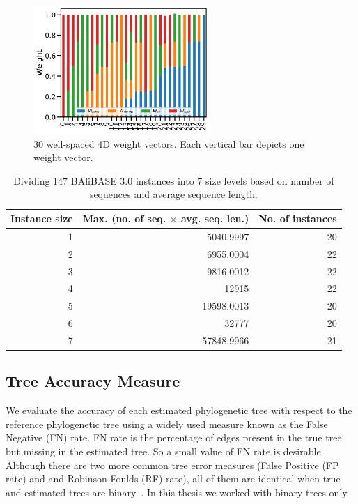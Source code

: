 \begin{figure}[!htbp]%
	\centering
	\includegraphics[width=0.6\textwidth]{Figure/30-4D-weight}
	\caption{30 well-spaced 4D weight vectors. Each vertical bar depicts one weight vector.}
	\label{fig:30-weights}
\end{figure}

\begin{table}[htbp]
	\centering
	\caption{Dividing 147 BAliBASE 3.0 instances into 7 size levels based on number of sequences and average sequence length.}
	\begin{tabular}{r|r|r}
		\multicolumn{1}{l|}{Instance size} & \multicolumn{1}{l|}{Max. (no. of seq. $\times$ avg. seq. len.)} & No. of instances\\
		\hline
		1     & 5040.9997 & 20 \\
		\hline
		2     & 6955.0004 & 22 \\
		\hline
		3     & 9816.0012 & 22 \\
		\hline
		4     & 12915 & 22 \\
		\hline
		5     & 19598.0013 & 20 \\
		\hline
		6     & 32777 & 20 \\
		\hline
		7     & 57848.9966 & 21\\
		\hline
	\end{tabular}%
	\label{tab:data-size}%
\end{table}%


\subsection{Tree Accuracy Measure} 
We evaluate the accuracy of each estimated phylogenetic tree with respect to the reference phylogenetic tree using a widely used measure known as the False Negative (FN) rate. FN rate is the percentage of edges present in the true tree but missing in the estimated tree. So a small value of FN rate is desirable. Although there are two more common tree error measures (False Positive (FP rate) and and Robinson-Foulds (RF) rate), all of them are identical when true and estimated trees are binary~\citep{warnow2017computational}. In this thesis we worked with binary trees only. %

